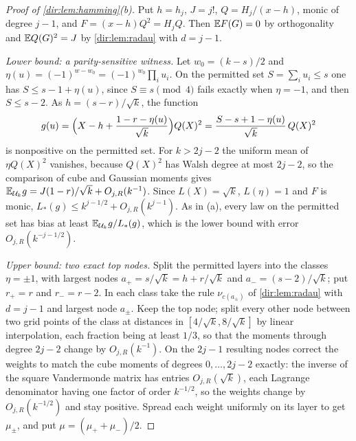 \begin{proof}[Proof of \cref{dir:lem:hamming}\textup{(b)}]
Put $h=h_j$, $J=j!$, $Q=H_j/(x-h)$, monic of degree $j-1$, and $F=(x-h)Q^2=H_jQ$. Then $\mathbb{E} F(G)=0$ by
orthogonality and $\mathbb{E} Q(G)^2=J$ by \cref{dir:lem:radau} with $d=j-1$.

\emph{Lower bound: a parity-sensitive witness.} Let $w_0=(k-s)/2$ and
$\eta(u)=(-1)^{w-w_0}=(-1)^{w_0}\prod_iu_i$. On the permitted set $S=\sum_iu_i\le s$ one has
$S\le s-1+\eta(u)$, since $S\equiv s\pmod 4$ fails exactly when $\eta=-1$, and then $S\le s-2$. As
$h=(s-r)/\sqrt k$, the function
\[
 g(u)=\Bigl(X-h+\frac{1-r-\eta(u)}{\sqrt k}\Bigr)Q(X)^2=\frac{S-s+1-\eta(u)}{\sqrt k}\,Q(X)^2
\]
is nonpositive on the permitted set. For $k>2j-2$ the uniform mean of $\eta Q(X)^2$ vanishes, because
$Q(X)^2$ has Walsh degree at most $2j-2$, so the comparison of cube and Gaussian moments gives
$\mathbb{E}_{\mathcal U_k}g=J(1-r)/\sqrt k+O_{j,R}(k^{-1})$. Since $L(X)=\sqrt k$, $L(\eta)=1$ and $F$ is monic,
$L_*(g)\le k^{j-1/2}+O_{j,R}(k^{j-1})$. As in (a), every law on the permitted set has bias at least
$\mathbb{E}_{\mathcal U_k}g/L_*(g)$, which is the lower bound with error $O_{j,R}(k^{-j-1/2})$.

\emph{Upper bound: two exact top nodes.} Split the permitted layers into the classes $\eta=\pm1$, with
largest nodes $a_+=s/\sqrt k=h+r/\sqrt k$ and $a_-=(s-2)/\sqrt k$; put $r_+=r$ and $r_-=r-2$. In each class
take the rule $\nu_{c(a_\pm)}$ of \cref{dir:lem:radau} with $d=j-1$ and largest node $a_\pm$. Keep the top
node; split every other node between two grid points of the class at distances in
$[4/\sqrt k,8/\sqrt k]$ by linear interpolation, each fraction being at least $1/3$, so that the moments
through degree $2j-2$ change by $O_{j,R}(k^{-1})$. On the $2j-1$ resulting nodes correct the weights to
match the cube moments of degrees $0,\dots,2j-2$ exactly: the inverse of the square Vandermonde matrix
has entries $O_{j,R}(\sqrt k)$, each Lagrange denominator having one factor of order $k^{-1/2}$, so the
weights change by $O_{j,R}(k^{-1/2})$ and stay positive. Spread each weight uniformly on its layer to get
$\mu_\pm$, and put $\mu=(\mu_++\mu_-)/2$.


\end{proof}
